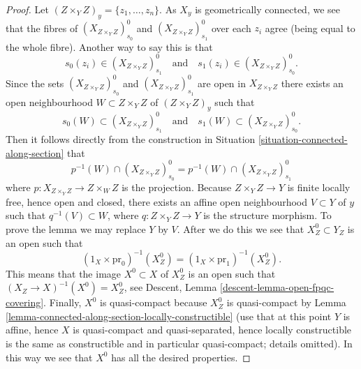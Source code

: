 \documentclass[10pt,a4paper]{amsart}
\theoremstyle{plain}
\theoremstyle{definition}
\theoremstyle{remark}
\numberwithin{equation}{subsection}
\begin{document}
\begin{proof}
\medskip\noindent
Let $(Z \times_Y Z)_y = \{z_1, \ldots, z_n\}$.
As $X_y$ is geometrically connected, we see that the fibres of
$(X_{Z \times_Y Z})_{s_0}^0$ and $(X_{Z \times_Y Z})_{s_1}^0$
over each $z_i$ agree (being equal to the whole fibre). Another
way to say this is that
$$
s_0(z_i) \in (X_{Z \times_Y Z})_{s_1}^0
\quad\text{and}\quad
s_1(z_i) \in (X_{Z \times_Y Z})_{s_0}^0.
$$
Since the sets $(X_{Z \times_Y Z})_{s_0}^0$ and $(X_{Z \times_Y Z})_{s_1}^0$
are open in $X_{Z \times_Y Z}$ there exists an open neighbourhood
$W \subset Z \times_Y Z$ of $(Z \times_Y Z)_y$ such that
$$
s_0(W) \subset (X_{Z \times_Y Z})_{s_1}^0
\quad\text{and}\quad
s_1(W) \subset (X_{Z \times_Y Z})_{s_0}^0.
$$
Then it follows directly from the construction in
Situation \ref{situation-connected-along-section}
that
$$
p^{-1}(W) \cap (X_{Z \times_Y Z})_{s_0}^0
=
p^{-1}(W) \cap (X_{Z \times_Y Z})_{s_1}^0
$$
where $p : X_{Z \times_Y Z} \to Z \times_W Z$ is the projection.
Because $Z \times_Y Z \to Y$ is finite locally free, hence open and closed,
there exists an affine open neighbourhood $V \subset Y$ of $y$ such that
$q^{-1}(V) \subset W$, where $q : Z \times_Y Z \to Y$ is the
structure morphism. To prove the lemma we may replace $Y$ by $V$.
After we do this we see that $X_Z^0 \subset Y_Z$ is an open such that
$$
(1_X \times \text{pr}_0)^{-1}(X_Z^0) =
(1_X \times \text{pr}_1)^{-1}(X_Z^0).
$$
This means that the image $X^0 \subset X$ of $X_Z^0$ is an open such
that $(X_Z \to X)^{-1}(X^0) = X_Z^0$, see
Descent, Lemma \ref{descent-lemma-open-fpqc-covering}.
Finally, $X^0$ is quasi-compact because $X_Z^0$ is quasi-compact
by Lemma \ref{lemma-connected-along-section-locally-constructible}
(use that at this point $Y$ is affine, hence $X$ is quasi-compact and
quasi-separated, hence locally constructible is the same as constructible
and in particular quasi-compact; details omitted).
In this way we see that $X^0$ has all the desired properties.
\end{proof}
\end{document}
